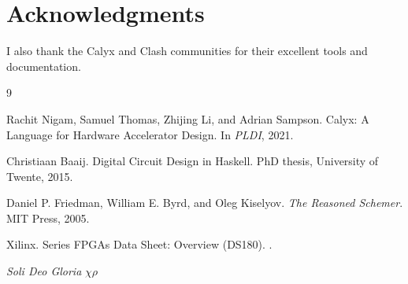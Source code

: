 \documentclass[11pt,a4paper]{article}
\begin{document}
\section*{Acknowledgments}

\standardacknowledgments

I also thank the Calyx and Clash communities for their excellent tools and
documentation.


\begin{thebibliography}{9}

Rachit Nigam, Samuel Thomas, Zhijing Li, and Adrian Sampson.
\newblock Calyx: A Language for Hardware Accelerator Design.
\newblock In \emph{PLDI}, 2021.

Christiaan Baaij.
\newblock Digital Circuit Design in Haskell.
\newblock PhD thesis, University of Twente, 2015.

Daniel P. Friedman, William E. Byrd, and Oleg Kiselyov.
\newblock \emph{The Reasoned Schemer}.
\newblock MIT Press, 2005.

Xilinx.
 Series FPGAs Data Sheet: Overview (DS180).
.

\end{thebibliography}

\vspace{1em}
\begin{center}
\textit{Soli Deo Gloria} $\chi\rho$
\end{center}
\end{document}
